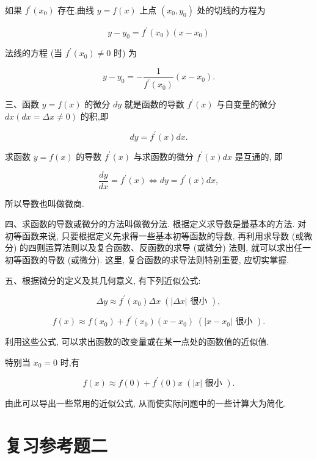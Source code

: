 \documentclass[lang=cn,newtx,12pt,scheme=chinese]{elegantbook}
\begin{document}
如果 \({f}^{\prime }\left( {x}_{0}\right)\) 存在,曲线 \(y = f\left( x\right)\) 上点 \(\left( {{x}_{0},{y}_{0}}\right)\) 处的切线的方程为

\[
y - {y}_{0} = {f}^{\prime }\left( {x}_{0}\right) \left( {x - {x}_{0}}\right)
\]

法线的方程 (当 \({f}^{\prime }\left( {x}_{0}\right) \neq 0\) 时) 为

\[
y - {y}_{0} = - \frac{1}{{f}^{\prime }\left( {x}_{0}\right) }\left( {x - {x}_{0}}\right) .
\]

三、函数 \(y = f\left( x\right)\) 的微分 \({dy}\) 就是函数的导数 \({f}^{\prime }\left( x\right)\) 与自变量的微分 \({dx}\left( {{dx} = {\Delta x} \neq 0}\right)\) 的积,即

\[
{dy} = {f}^{\prime }\left( x\right) {dx}.
\]

求函数 \(y = f\left( x\right)\) 的导数 \({f}^{\prime }\left( x\right)\) 与求函数的微分 \({f}^{\prime }\left( x\right) {dx}\) 是互通的, 即

\[
\frac{dy}{dx} = {f}^{\prime }\left( x\right) \Leftrightarrow {dy} = {f}^{\prime }\left( x\right) {dx},
\]

所以导数也叫做微商.

四、求函数的导数或微分的方法叫做微分法. 根据定义求导数是最基本的方法. 对初等函数来说, 只要根据定义先求得一些基本初等函数的导数, 再利用求导数 (或微分) 的四则运算法则以及复合函数、反函数的求导 (或微分) 法则, 就可以求出任一初等函数的导数 (或微分). 这里, 复合函数的求导法则特别重要, 应切实掌握.

五、根据微分的定义及其几何意义, 有下列近似公式:

\[
{\Delta y} \approx {f}^{\prime }\left( {x}_{0}\right) {\Delta x}\;\left( {\left| {\Delta x}\right| \text{ 很小 }}\right) ,
\]

\[
f\left( x\right) \approx f\left( {x}_{0}\right) + {f}^{\prime }\left( {x}_{0}\right) \left( {x - {x}_{0}}\right) \;\left( {\left| {x - {x}_{0}}\right| \text{ 很小 }}\right) .
\]

利用这些公式, 可以求出函数的改变量或在某一点处的函数值的近似值.

特别当 \({x}_{0} = 0\) 时,有

\[
f\left( x\right) \approx f\left( 0\right) + {f}^{\prime }\left( 0\right) x\;\left( {\left| x\right| \text{ 很小 }}\right) .
\]

由此可以导出一些常用的近似公式, 从而使实际问题中的一些计算大为简化.

\chapter*{复习参考题二}
\end{document}

